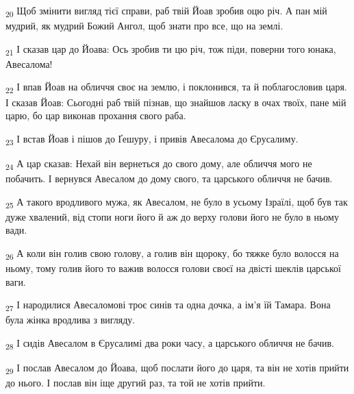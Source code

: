 \begin{tcolorbox}
\textsubscript{20} Щоб змінити вигляд тієї справи, раб твій Йоав зробив оцю річ. А пан мій мудрий, як мудрий Божий Ангол, щоб знати про все, що на землі.
\end{tcolorbox}
\begin{tcolorbox}
\textsubscript{21} І сказав цар до Йоава: Ось зробив ти цю річ, тож піди, поверни того юнака, Авесалома!
\end{tcolorbox}
\begin{tcolorbox}
\textsubscript{22} І впав Йоав на обличчя своє на землю, і поклонився, та й поблагословив царя. І сказав Йоав: Сьогодні раб твій пізнав, що знайшов ласку в очах твоїх, пане мій царю, бо цар виконав прохання свого раба.
\end{tcolorbox}
\begin{tcolorbox}
\textsubscript{23} І встав Йоав і пішов до Ґешуру, і привів Авесалома до Єрусалиму.
\end{tcolorbox}
\begin{tcolorbox}
\textsubscript{24} А цар сказав: Нехай він вернеться до свого дому, але обличчя мого не побачить. І вернувся Авесалом до дому свого, та царського обличчя не бачив.
\end{tcolorbox}
\begin{tcolorbox}
\textsubscript{25} А такого вродливого мужа, як Авесалом, не було в усьому Ізраїлі, щоб був так дуже хвалений, від стопи ноги його й аж до верху голови його не було в ньому вади.
\end{tcolorbox}
\begin{tcolorbox}
\textsubscript{26} А коли він голив свою голову, а голив він щороку, бо тяжке було волосся на ньому, тому голив його то важив волосся голови своєї на двісті шеклів царської ваги.
\end{tcolorbox}
\begin{tcolorbox}
\textsubscript{27} І народилися Авесаломові троє синів та одна дочка, а ім'я їй Тамара. Вона була жінка вродлива з вигляду.
\end{tcolorbox}
\begin{tcolorbox}
\textsubscript{28} І сидів Авесалом в Єрусалимі два роки часу, а царського обличчя не бачив.
\end{tcolorbox}
\begin{tcolorbox}
\textsubscript{29} І послав Авесалом до Йоава, щоб послати його до царя, та він не хотів прийти до нього. І послав він іще другий раз, та той не хотів прийти.
\end{tcolorbox}
